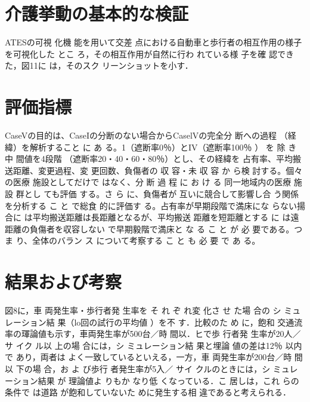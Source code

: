 \section{介護挙動の基本的な検証}

ATESの可視 化機 能を用いて交差 点における自動車と歩行者の相互作用の様子を可視化した とこ ろ，その相互作用が自然に行わ れている様 子を確 認できた，図11に は，そのスク リーンショットを小す．

\section{評価指標}

CaseVの目的は、CaseIの分断のない場合からCaselVの完全分 断への過程 （経緯）を解析すること に あ る。1（遮断率0％）とIV（遮断率100％ ） を 除 き 中 間値を4段階 （遮断率20・40・60・80％）とし、その経緯を 占有率、平均搬送距離、変更過程、変 更回数、負傷者の 収 容・未 収 容 か ら検 討する。個々の医療 施設としてだけで はなく、分 断 過 程 に お け る 同一地域内の医療 施設 群とし ても評価 する。さ ら に、負傷者が 互いに競合して影響し合 う関係 を分析する こ と で総食 的に評価す る。占有率が早期段階で満床にな らない揚合に は平均搬送距離は長距離となるが、平均搬送 距離を短距離とする に は遠距離の負傷者を収容しない で早期毅階で満床と な る こ と が 必 要である。つま り、全体のバラン ス について考察する こ と も 必 要 で あ る。

\section{結果および考察}

図8に，車 両発生率・歩行者発 生率を そ れ ぞ れ変 化さ せ た場 合の シ ミュレーション結 果（lo回の試行の平均値 ）を不 す．比較のた め に，飽和 交通流率の琿論値も示す，車両発生率が500台／時 間以．ヒで歩 行者発 生率が20人／サ イク ル以 上の場 合には，シ ミュレーション結 果と埋論 値の差は12％ 以内で あり，両者は よく一致しているといえる，一方，車 両発生率が200台／時 間以 下の場 合，お よ び歩行 者発生率が5入／ サイ クルのときには，シ ミュレーション結果 が 理論値よ りもか なり低 くなっている．こ 居しは，これ らの条件で は道路 が飽和していないた めに発生する相 違であると考えられる．
